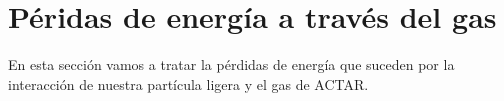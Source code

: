 \section{Péridas de energía a través del gas}

En esta sección vamos a tratar la pérdidas de energía que suceden por la interacción de nuestra partícula ligera y el gas de ACTAR.

